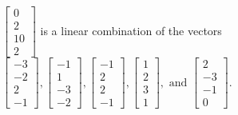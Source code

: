 \begin{exercise}
\begin{exerciseStatement}
  \end{exerciseStatement}
  \begin{exerciseAnswer}
   \(\left[\begin{array}{c}
0 \\
2 \\
10 \\
2
\end{array}\right]\) 
  	 is  
	a linear combination of the vectors \(\left[\begin{array}{c}
-3 \\
-2 \\
2 \\
-1
\end{array}\right] , \left[\begin{array}{c}
-1 \\
1 \\
-3 \\
-2
\end{array}\right] , \left[\begin{array}{c}
-1 \\
2 \\
2 \\
-1
\end{array}\right] , \left[\begin{array}{c}
1 \\
2 \\
3 \\
1
\end{array}\right] , \text{ and } \left[\begin{array}{c}
2 \\
-3 \\
-1 \\
0
\end{array}\right]\).

	
  


  \end{exerciseAnswer}
\end{exercise}